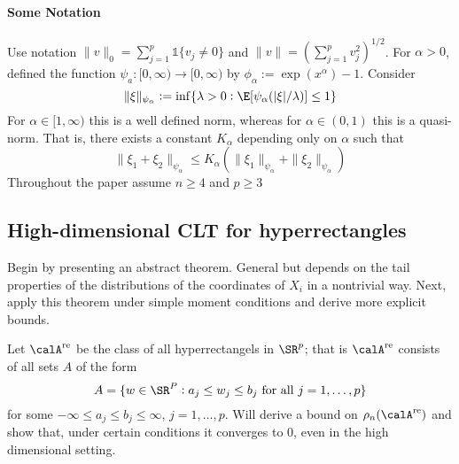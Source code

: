\paragraph{Some Notation} 

Use notation $\|v\|_0 = \sum_{j=1}^p \mathds{1}\{v_j\neq 0\}$ and $\|v\| = (\sum_{j=1}^p v_j^2)^{1/2}$. For $\alpha > 0$, defined the function $\psi_a :[0, \infty) \to [0, \infty)$ by $\phi_\alpha := \exp(x^\alpha) - 1$. Consider 
\[ \|\xi\|_{\psi_\alpha} := \inf \{\lambda > 0: \E[\psi_\alpha(|\xi|/\lambda)] \leq 1 \} \]
For $\alpha \in [1,\infty)$ this is a well defined norm, whereas for $\alpha \in (0,1)$ this is a quasi-norm. That is, there exists a constant $K_\alpha$ depending only on $\alpha$ such that 
\[\|\xi_1 + \xi_2\|_{\psi_\alpha} \leq K_\alpha (\|\xi_1\|_{\psi_\alpha} + \|\xi_2\|_{\psi_\alpha})\]
Throughout the paper assume $n\geq 4$ and $p \geq 3$

\subsection{High-dimensional CLT for hyperrectangles}

Begin by presenting an abstract theorem. General but depends on the tail properties of the distributions of the coordinates of $X_i$ in a nontrivial way. Next, apply this theorem under simple moment conditions and derive more explicit bounds. 

Let $\calA^{\text{re}}$ be the class of all hyperrectangels in $\SR^p$; that is $\calA^{\text{re}}$ consists of all sets $A$ of the form 
\begin{equation}
	\label{eq:cck17-4}
	A = \{w \in \SR^P: a_j \leq w_j \leq b_j\text{ for all }j = 1, \dots, p\}
\end{equation}
for some $-\infty \leq a_j \leq b_j \leq \infty$, $j = 1, \dots, p$. Will derive a bound on $\rho_n(\calA^{\text{re}})$ and show that, under certain conditions it converges to 0, even in the high dimensional setting. 

